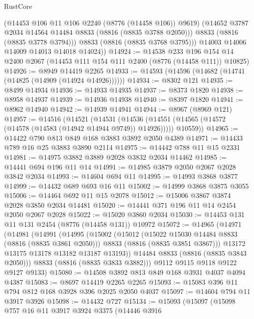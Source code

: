 \begin{lexlean}{RustCore}
\begin{coremodule}
            (@14453 @106 @11 @106 @2240 (@8776 (@14458 @106)) @9619)
            (@14652 @3787 @2034 @14564 @14484 @8833 (@8816 (@8835 @3788 @2050)))
            @8833
            (@8816 (@8835 @3778 @3794)))
          @8833
          (@8816 (@8835 @3768 @3795)))
        @14003
        @14006
        @14009
        @14013
        @14018
        @14024))
@14924 := @14538
    @233
    @196
    @154
    @14
    @2400
    @2067
    (@14453 @111 @154 @111 @2400 (@8776 (@14458 @111)) @10825)
@14926 := @8949 @14419 @2265
@14933 := @14593 (@14596 (@14682 (@14741 (@14825 (@14909 (@14924 @14926))))))
@14934 := @8302 @121
@14935 := @8499 @14934
@14936 := @14933 @14935
@14937 := @8373 @1820
@14938 := @8958 @14937
@14939 := @14936 @14938
@14940 := @8397 @1820
@14941 := @8962 @14940
@14942 := @14939 @14941
@14944 := @8967 (@8969 @121)
@14957 := @14516
    (@14521
      (@14531
        (@14536 (@14551 (@14565 (@14572 (@14578 (@14583 (@14942 @14944 @9749)) @14926)))))
        @10559))
@14965 := @14422 @790 @813 @849 @168 @3883 @3892 @2050 @4389
@14971 := @14433 @789 @16 @25 @3883 @3890 @2114
@14975 := @14442 @788 @11 @15 @2331
@14981 := @14975 @3882 @3889 @2028 @3832 @2034 @14462
@14985 := @14441 @694 @196 @11 @14
@14991 := @14985 @3879 @2050 @2067 @2028 @3842 @2034
@14993 := @14604 @694 @11
@14995 := @14993 @3868 @3877
@14999 := @14432 @689 @693 @16 @11
@15002 := @14999 @3868 @3875 @3055
@15006 := @14464 @692 @11 @15 @2078
@15012 := @15006 @3867 @3874 @2028 @3850 @2034 @14481
@15020 := @14441 @371 @196 @11 @14 @2454 @2050 @2067 @2028
@15022 := @15020 @3860 @2034
@15030 := @14453 @131 @11 @131 @2454 (@8776 (@14458 @131)) @10972
@15072 := @14965
    (@14971
      (@14981
        (@14991
          (@14995
            (@15002
              (@15012
                (@15022 @15030 @14484 @8833 (@8816 (@8835 @3861 @2050)))
                @8833
                (@8816 (@8835 @3851 @3867)))
              @13172
              @13175
              @13178
              @13182
              @13187
              @13193))
          @14484
          @8833
          (@8816 (@8835 @3843 @2050)))
        @8833
        (@8816 (@8835 @3833 @3882)))
      @9112
      @9115
      @9118
      @9122
      @9127
      @9133)
@15080 := @14508 @3892 @813 @849 @168 @3931 @4037 @4094 @4387
@15083 := @8697 @14419 @2265 @2265
@15093 := @15083 @396 @11 @794 @812 @168 @3928 @396 @2025 @2050 @4037
@15097 := @14604 @794 @11 @3917 @3926
@15098 := @14432 @727
@15134 := @15093
    (@15097
      (@15098
        @757
        @16
        @11
        @3917
        @3924
        @3375
        (@14446
          @3916

\end{coremodule}
\end{lexlean}
